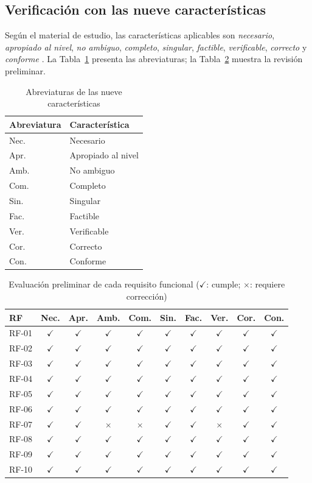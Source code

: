 \documentclass[conference,onecolumn]{IEEEtran}
\newcommand{\si}{\ensuremath{\checkmark}}
\newcommand{\no}{\ensuremath{\times}}
\begin{document}
\subsection{Verificación con las nueve características}
Según el material de estudio, las características aplicables son \emph{necesario}, \emph{apropiado al nivel}, \emph{no ambiguo}, \emph{completo}, \emph{singular}, \emph{factible}, \emph{verificable}, \emph{correcto} y \emph{conforme} \cite{uteqsemana1,ieee29148}. La Tabla~\ref{tab:abreviaturas} presenta las abreviaturas; la Tabla~\ref{tab:evaluacion} muestra la revisión preliminar.

\begin{table}[H]
\caption{Abreviaturas de las nueve características}
\label{tab:abreviaturas}
\centering\footnotesize
\begin{tabular}{@{}ll@{}}
\toprule
\textbf{Abreviatura} & \textbf{Característica}\\
\midrule
Nec. & Necesario\\
Apr. & Apropiado al nivel\\
Amb. & No ambiguo\\
Com. & Completo\\
Sin. & Singular\\
Fac. & Factible\\
Ver. & Verificable\\
Cor. & Correcto\\
Con. & Conforme\\
\bottomrule
\end{tabular}
\end{table}

\begin{table}[H]
\caption{Evaluación preliminar de cada requisito funcional (\si: cumple; \no: requiere corrección)}
\label{tab:evaluacion}
\centering\small
\setlength{\tabcolsep}{9pt}
\begin{tabular}{@{}l*{9}{c}@{}}
\toprule
\textbf{RF} & \textbf{Nec.} & \textbf{Apr.} & \textbf{Amb.} & \textbf{Com.} & \textbf{Sin.} & \textbf{Fac.} & \textbf{Ver.} & \textbf{Cor.} & \textbf{Con.}\\
\midrule
RF-01 & \si & \si & \si & \si & \si & \si & \si & \si & \si\\
RF-02 & \si & \si & \si & \si & \si & \si & \si & \si & \si\\
RF-03 & \si & \si & \si & \si & \si & \si & \si & \si & \si\\
RF-04 & \si & \si & \si & \si & \si & \si & \si & \si & \si\\
RF-05 & \si & \si & \si & \si & \si & \si & \si & \si & \si\\
RF-06 & \si & \si & \si & \si & \si & \si & \si & \si & \si\\
RF-07 & \si & \si & \no & \no & \si & \si & \no & \si & \si\\
RF-08 & \si & \si & \si & \si & \si & \si & \si & \si & \si\\
RF-09 & \si & \si & \si & \si & \si & \si & \si & \si & \si\\
RF-10 & \si & \si & \si & \si & \si & \si & \si & \si & \si\\
\bottomrule
\end{tabular}
\end{table}
\end{document}
